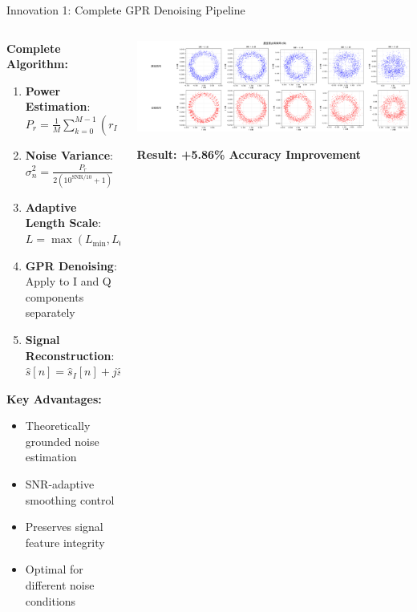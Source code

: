 \documentclass[aspectratio=169]{beamer}
\begin{document}
\begin{frame}{Innovation 1: Complete GPR Denoising Pipeline}
\begin{columns}
\begin{column}{0.6\textwidth}
\textbf{Complete Algorithm:}
\begin{enumerate}
\item \textbf{Power Estimation}: $P_r = \frac{1}{M}\sum_{k=0}^{M-1}(r_I[k]^2+r_Q[k]^2)$
\item \textbf{Noise Variance}: $\sigma_n^2 = \frac{P_r}{2(10^{\text{SNR}/10} + 1)}$
\item \textbf{Adaptive Length Scale}: $L = \max(L_{\min}, L_0(1 + \text{SNR}/20))$
\item \textbf{GPR Denoising}: Apply to I and Q components separately
\item \textbf{Signal Reconstruction}: $\hat{s}[n] = \hat{s}_I[n] + j\hat{s}_Q[n]$
\end{enumerate}

\vspace{0.1cm}
\textbf{Key Advantages:}
\begin{itemize}
\setlength{\itemsep}{0em}
\item \textcolor{zjutgreen}{Theoretically grounded noise estimation}
\item \textcolor{zjutgreen}{SNR-adaptive smoothing control}
\item \textcolor{zjutgreen}{Preserves signal feature integrity}
\item \textcolor{zjutgreen}{Optimal for different noise conditions}
\end{itemize}
\end{column}
\begin{column}{0.4\textwidth}
\includegraphics[width=\textwidth]{../paper/figure/constellation_denoising.png}

\vspace{0.3cm}
\begin{center}
\textcolor{zjutblue}{\textbf{Result: +5.86\% Accuracy Improvement}}
\end{center}
\end{column}
\end{columns}
\end{frame}
\end{document}
